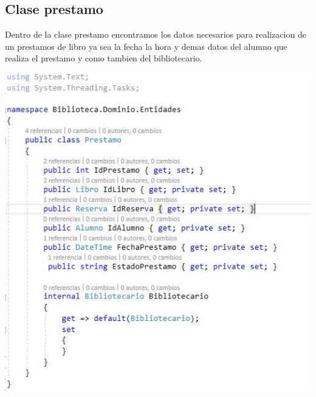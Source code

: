  \subsection{Clase prestamo}
 Dentro de la clase prestamo encontramos los datos necesarios para realizacion de un prestamos de libro ya sea la fecha la hora y demas datos del alumno que realiza el prestamo y como tambien del bibliotecario.
 	\begin{center}
	\includegraphics[width=14cm]{./Imagenes/img12prestamo} 
	\end{center}
	
	
 \newpage
